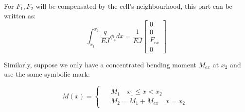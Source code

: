 For $F_1,F_2$ will be compensated by the cell's neighbourhood, this part can be written as:
\begin{equation}
    \int_{x_1}^{x_2}
        \frac{q}{EJ}\phi_i
        dx
        =
        \frac{1}{EJ}
        \begin{bmatrix}
            0\\
            0\\
            F_{ex}\\
            0
        \end{bmatrix}
\end{equation}

Similarly, suppose we only have a concentrated bending moment $M_{ex}$ at $x_2$ and use the same symbolic mark:

\begin{equation}
    M(x)=
    \begin{cases}
        \begin{aligned}
            &M_1 \quad x_1\leq x < x_2\\
            &M_2=M_1 + M_{ex} \quad x=x_2
        \end{aligned}
    \end{cases}
\end{equation}

